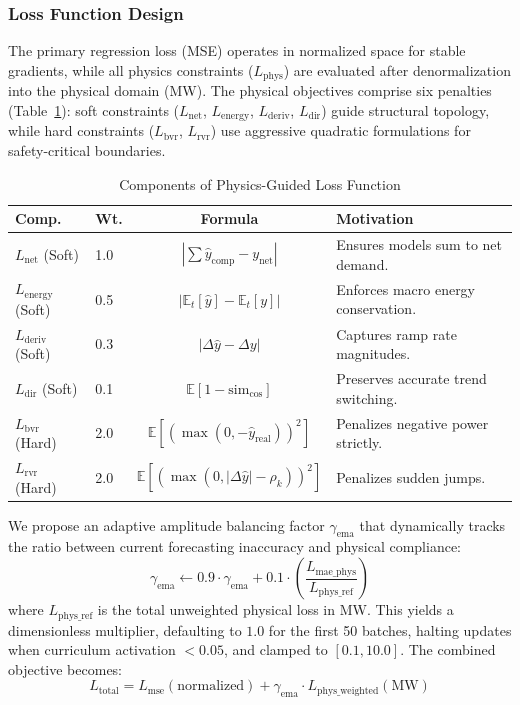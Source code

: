 \subsubsection{Loss Function Design}
The primary regression loss (MSE) operates in normalized space for stable gradients, while all physics constraints ($L_{\text{phys}}$) are evaluated after denormalization into the physical domain (MW). The physical objectives comprise six penalties (Table~\ref{tab:losses}): soft constraints ($L_{\text{net}}$, $L_{\text{energy}}$, $L_{\text{deriv}}$, $L_{\text{dir}}$) guide structural topology, while hard constraints ($L_{\text{bvr}}$, $L_{\text{rvr}}$) use aggressive quadratic formulations for safety-critical boundaries.

\begin{table}[htbp]
\caption{Components of Physics-Guided Loss Function}
\label{tab:losses}
\centering
\footnotesize
\setlength{\tabcolsep}{3pt}
\begin{tabularx}{\columnwidth}{@{}llc>{\raggedright\arraybackslash}X@{}}
\toprule
\textbf{Comp.} & \textbf{Wt.} & \textbf{Formula} & \textbf{Motivation} \\ \midrule
$L_{\text{net}}$ (Soft) & 1.0 & $|\sum \hat{y}_{\text{comp}} - y_{\text{net}}|$ & Ensures models sum to net demand. \\
$L_{\text{energy}}$ (Soft) & 0.5 & $|\mathbb{E}_t[\hat{y}] - \mathbb{E}_t[y]|$ & Enforces macro energy conservation. \\
$L_{\text{deriv}}$ (Soft) & 0.3 & $|\Delta \hat{y} - \Delta y|$ & Captures ramp rate magnitudes. \\
$L_{\text{dir}}$ (Soft) & 0.1 & $\mathbb{E} [1 {-} \text{sim}_{\text{cos}}]$ & Preserves accurate trend switching. \\ \midrule
$L_{\text{bvr}}$ (Hard) & 2.0 & $\mathbb{E} [(\max(0, -\hat{y}_{\text{real}}))^2]$ & Penalizes negative power strictly. \\
$L_{\text{rvr}}$ (Hard) & 2.0 & $\mathbb{E} [(\max(0, |\Delta\hat{y}| {-} \rho_k))^2]$ & Penalizes sudden jumps. \\ \bottomrule
\end{tabularx}
\end{table}

We propose an adaptive amplitude balancing factor $\gamma_{\text{ema}}$ that dynamically tracks the ratio between current forecasting inaccuracy and physical compliance:
\begin{equation}
    \gamma_{\text{ema}} \leftarrow 0.9 \cdot \gamma_{\text{ema}} + 0.1 \cdot \left( \frac{L_{\text{mae\_phys}}}{L_{\text{phys\_ref}}} \right)
\label{eq:gamma_ema}
\end{equation}
where $L_{\text{phys\_ref}}$ is the total unweighted physical loss in MW. This yields a dimensionless multiplier, defaulting to $1.0$ for the first 50 batches, halting updates when curriculum activation $< 0.05$, and clamped to $[0.1, 10.0]$. The combined objective becomes:
\begin{equation}
    L_{\text{total}} = L_{\text{mse}}(\text{normalized}) + \gamma_{\text{ema}} \cdot L_{\text{phys\_weighted}}(\text{MW})
\label{eq:total_loss}
\end{equation}

